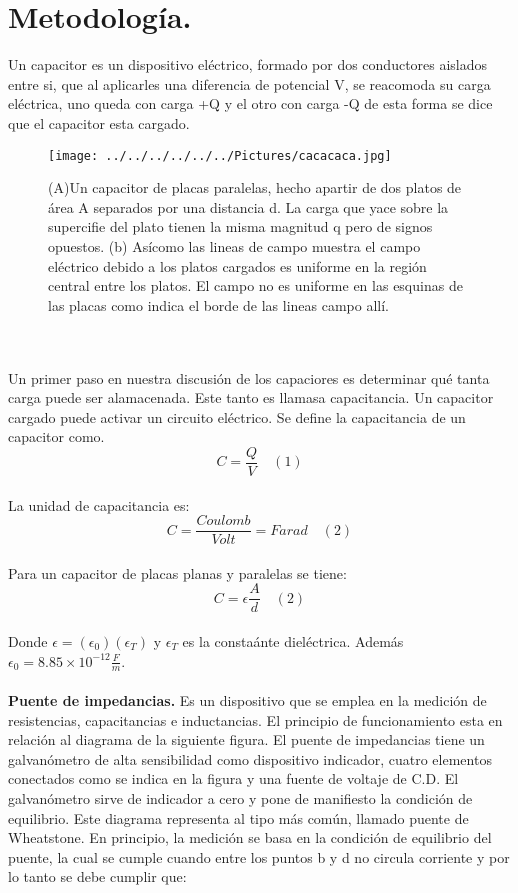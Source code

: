 \documentclass[11pt,a4paper]{article}
\begin{document}
\section{Metodolog\'{i}a.}
Un capacitor es un dispositivo el\'{e}ctrico, formado por dos conductores aislados entre si, que al aplicarles una diferencia de potencial V, se reacomoda su carga el\'{e}ctrica, uno queda con carga +Q y el otro con carga -Q de esta forma se dice que el capacitor esta cargado.
\\
\begin{figure}[hbtp]
\centering
\texttt{[image: ../../../../../../Pictures/cacacaca.jpg]} 
\caption{(A)Un capacitor de placas paralelas, hecho apartir de dos platos de \'{a}rea A separados por una distancia d. La carga que yace sobre la supercifie del plato tienen la misma magnitud q pero de signos opuestos. (b) As\'{i}como las lineas de campo muestra el campo el\'{e}ctrico debido a los platos cargados es uniforme en la regi\'{o}n central entre los platos. El campo no es uniforme en las esquinas de las placas como indica el borde de las lineas campo all\'{i}.}
\end{figure}
\\
\\
Un primer paso en nuestra discusi\'{o}n de los capaciores es determinar qu\'{e} tanta carga puede ser alamacenada. Este tanto es llamasa capacitancia. Un capacitor cargado puede activar un circuito el\'{e}ctrico. Se define la capacitancia de un capacitor como. 
\\
\[C=\frac{Q}{V} \quad (1)\]
\\
La unidad de capacitancia es:
\\
\[C= \frac{Coulomb}{Volt}= Farad \quad (2)\]
\\
Para un capacitor de placas planas y paralelas se tiene:
\\ 
\[C=\epsilon \frac{A}{d} \quad (2)\]
\\
Donde $\epsilon=({\epsilon}_{0})({\epsilon}_{T})$ y ${\epsilon}_{T}$ es la consta\'{a}nte diel\'{e}ctrica. Adem\'{a}s ${\epsilon}_{0} = 8.85\times 10^{-12} \frac{F}{m}$.
\\
\\
\textbf{Puente de impedancias.}
Es un dispositivo que se emplea en la medici\'{o}n de resistencias, capacitancias e inductancias. El principio de funcionamiento esta en relaci\'{o}n al diagrama de la siguiente figura. El puente de impedancias tiene un galvan\'{o}metro de alta sensibilidad como dispositivo indicador, cuatro elementos conectados como se indica en la figura y una fuente de voltaje de C.D. El galvan\'{o}metro sirve de indicador a cero y pone de manifiesto la condici\'{o}n de equilibrio. Este diagrama representa al tipo m\'{a}s com\'{u}n, llamado puente de Wheatstone. En principio, la medici\'{o}n se basa en la condici\'{o}n de equilibrio del puente, la cual se cumple cuando entre los puntos b y d no circula corriente y por lo tanto se debe cumplir que:
\end{document}
